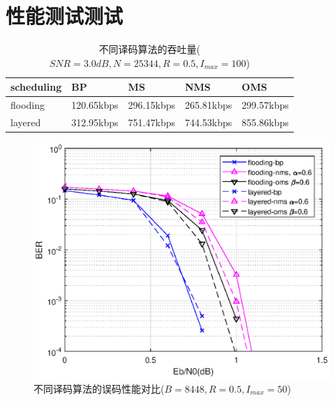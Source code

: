 \documentclass{article}
\begin{document}
\section{性能测试测试}
\begin{table}[H]
	\caption{不同译码算法的吞吐量($SNR=3.0dB, N=25344,R=0.5,I_{max}=100$)}
	\centering
	\begin{tabular}{|l|l|l|l|l|}%
		\hline  %
		scheduling	& BP         & MS         & NMS        & OMS        \\
		\hline
		flooding	& 120.65kbps & 296.15kbps & 265.81kbps & 299.57kbps \\
		\hline
		layered		& 312.95kbps & 751.47kbps & 744.53kbps & 855.86kbps \\
		\hline  %
	\end{tabular}
\end{table}
\begin{figure}[H]
	\centering
	\includegraphics[width = \textwidth]{fig_r12_K8448L.eps}
	\caption{{不同译码算法的误码性能对比($B=8448,R=0.5,I_{max}=50$)}}
\end{figure}
\end{document}
